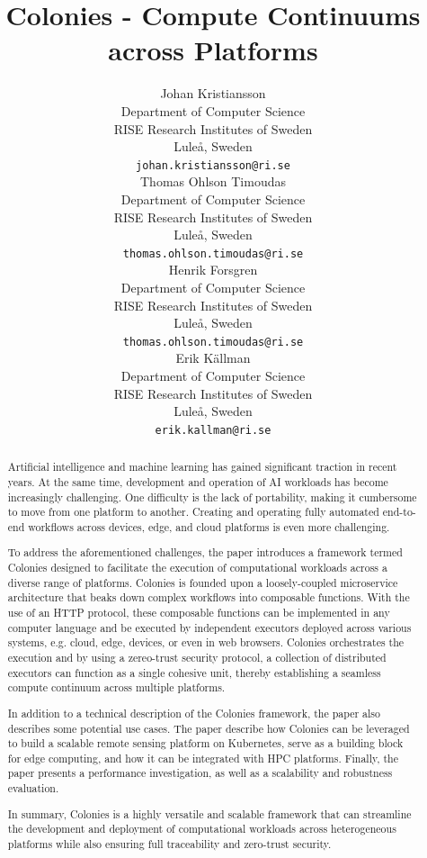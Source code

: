 \documentclass{article}
\title{Colonies - Compute Continuums across Platforms}
\author{{\hspace{1mm}Johan Kristiansson} \\
	Department of Computer Science \\
	RISE Research Institutes of Sweden \\
	Luleå, Sweden \\
	\texttt{johan.kristiansson@ri.se} \\
	\And
	{\hspace{1mm}Thomas Ohlson Timoudas} \\
	Department of Computer Science \\
	RISE Research Institutes of Sweden \\
	Luleå, Sweden \\
	\texttt{thomas.ohlson.timoudas@ri.se} \\
	\And
	{\hspace{1mm}Henrik Forsgren} \\
	Department of Computer Science \\
	RISE Research Institutes of Sweden \\
	Luleå, Sweden \\
	\texttt{thomas.ohlson.timoudas@ri.se} \\
	\And
	{\hspace{1mm}Erik Källman} \\
	Department of Computer Science \\
	RISE Research Institutes of Sweden \\
	Luleå, Sweden \\
	\texttt{erik.kallman@ri.se} \\
}
\begin{document}
\maketitle

\begin{abstract}
Artificial intelligence and machine learning has gained significant traction in recent years. At the same time, development and operation of AI workloads has become increasingly challenging. One difficulty is the lack of portability, making it cumbersome to move from one platform to another. Creating and operating fully automated end-to-end workflows across devices, edge, and cloud platforms is even more challenging.

To address the aforementioned challenges, the paper introduces a framework termed Colonies designed to facilitate the execution of computational workloads across a diverse range of platforms. Colonies is founded upon a loosely-coupled microservice architecture that beaks down complex workflows into composable functions. With the use of an HTTP protocol, these composable functions can be implemented in any computer language and be executed by independent executors deployed across various systems, e.g. cloud, edge, devices, or even in web browsers. Colonies orchestrates the execution and by using a zereo-trust security protocol, a collection of distributed executors can function as a single cohesive unit, thereby establishing a seamless compute continuum across multiple platforms.

In addition to a technical description of the Colonies framework, the paper also describes some potential use cases. The paper describe how Colonies can be leveraged to build a scalable remote sensing platform on Kubernetes, serve as a building block for edge computing, and how it can be integrated with HPC platforms. Finally, the paper presents a performance investigation, as well as a scalability and robustness evaluation. 

In summary, Colonies is a highly versatile and scalable framework that can streamline the development and deployment of computational workloads across heterogeneous platforms while also ensuring full traceability and zero-trust security.
\end{abstract}

\end{document}
